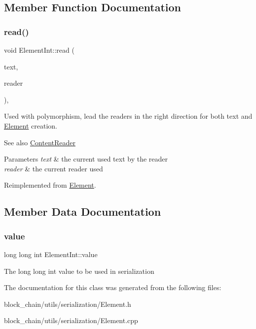 \subsection{Member Function Documentation}
\mbox{\label{classElementInt_ab5a7d87743dbdc52910c59bc4b93e6da}} 
\subsubsection{\texorpdfstring{read()}{read()}}
{\footnotesize\ttfamily void Element\+Int\+::read (\begin{DoxyParamCaption}\item[{std\+::string \&}]{text,  }\item[{const \mbox{\hyperlink{classContentReader}{Content\+Reader}} $\ast$}]{reader }\end{DoxyParamCaption})\hspace{0.3cm}{\ttfamily [override]}, {\ttfamily [virtual]}}

Used with polymorphism, lead the readers in the right direction for both text and \mbox{\hyperlink{classElement}{Element}} creation. \begin{DoxySeeAlso}{See also}
\mbox{\hyperlink{classContentReader}{Content\+Reader}}
\end{DoxySeeAlso}

\begin{DoxyParams}{Parameters}
{\em text} & the current used text by the reader \\
\hline
{\em reader} & the current reader used \\
\hline
\end{DoxyParams}


Reimplemented from \mbox{\hyperlink{classElement_ab468bd37a9558f5227837a9236bc9e4b}{Element}}.



\subsection{Member Data Documentation}
\mbox{\label{classElementInt_ab43f27a056222463dc4bd246337dfa63}} 
\subsubsection{\texorpdfstring{value}{value}}
{\footnotesize\ttfamily long long int Element\+Int\+::value}

The long long int value to be used in serialization 

The documentation for this class was generated from the following files\+:\begin{DoxyCompactItemize}
\item 
block\+\_\+chain/utils/serialization/Element.\+h\item 
block\+\_\+chain/utils/serialization/Element.\+cpp\end{DoxyCompactItemize}
